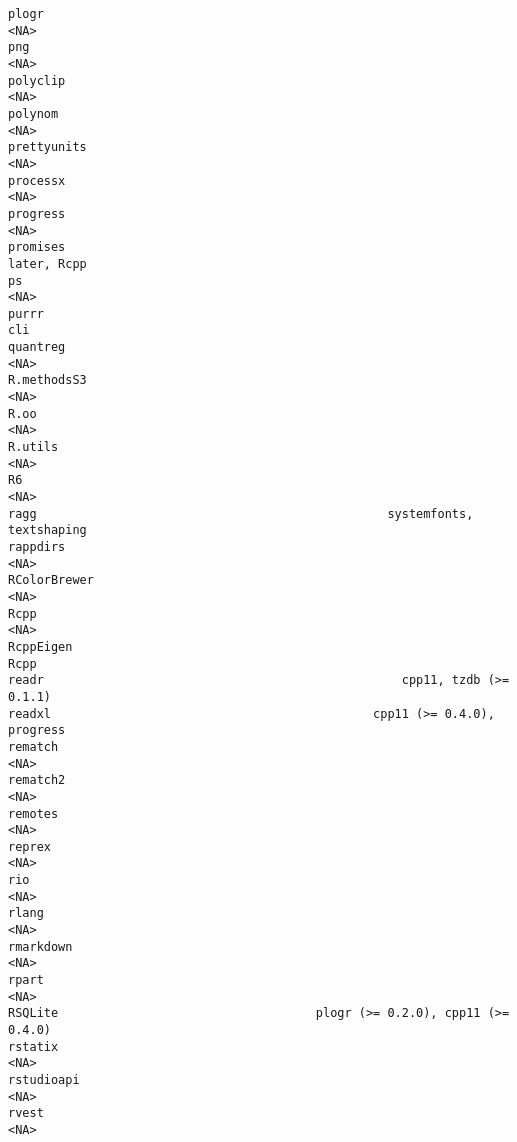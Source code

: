 \documentclass[
  letterpaper,
  DIV=11,
  numbers=noendperiod]{scrreprt}
\begin{document}
\begin{verbatim}
plogr                                                                    <NA>
png                                                                      <NA>
polyclip                                                                 <NA>
polynom                                                                  <NA>
prettyunits                                                              <NA>
processx                                                                 <NA>
progress                                                                 <NA>
promises                                                          later, Rcpp
ps                                                                       <NA>
purrr                                                                     cli
quantreg                                                                 <NA>
R.methodsS3                                                              <NA>
R.oo                                                                     <NA>
R.utils                                                                  <NA>
R6                                                                       <NA>
ragg                                                 systemfonts, textshaping
rappdirs                                                                 <NA>
RColorBrewer                                                             <NA>
Rcpp                                                                     <NA>
RcppEigen                                                                Rcpp
readr                                                  cpp11, tzdb (>= 0.1.1)
readxl                                             cpp11 (>= 0.4.0), progress
rematch                                                                  <NA>
rematch2                                                                 <NA>
remotes                                                                  <NA>
reprex                                                                   <NA>
rio                                                                      <NA>
rlang                                                                    <NA>
rmarkdown                                                                <NA>
rpart                                                                    <NA>
RSQLite                                    plogr (>= 0.2.0), cpp11 (>= 0.4.0)
rstatix                                                                  <NA>
rstudioapi                                                               <NA>
rvest                                                                    <NA>

\end{verbatim}
\end{document}
